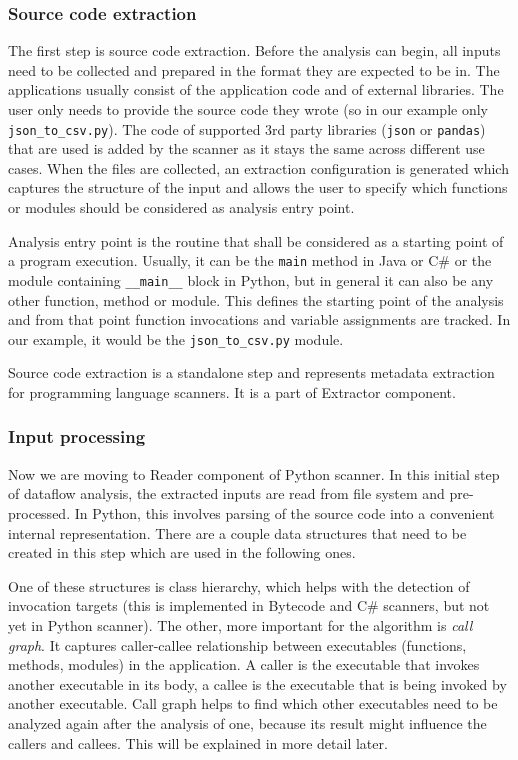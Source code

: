 \subsubsection{Source code extraction}

The first step is source code extraction. Before the analysis can begin, all inputs need to be collected and prepared in the format they are expected to be in. The applications usually consist of the application code and of external libraries. The user only needs to provide the source code they wrote (so in our example only \texttt{json\_to\_csv.py}). The code of supported 3rd party libraries (\texttt{json} or \texttt{pandas}) that are used is added by the scanner as it stays the same across different use cases. When the files are collected, an extraction configuration is generated which captures the structure of the input and allows the user to specify which functions or modules should be considered as analysis entry point.
\par
Analysis entry point is the routine that shall be considered as a starting point of a program execution. Usually, it can be the \texttt{main} method in Java or C\# or the module containing \texttt{\_\_main\_\_} block in Python, but in general it can also be any other function, method or module. This defines the starting point of the analysis and from that point function invocations and variable assignments are tracked. In our example, it would be the \texttt{json\_to\_csv.py} module.
\par
Source code extraction is a standalone step and represents metadata extraction for programming language scanners. It is a part of Extractor component.

\subsubsection{Input processing}

Now we are moving to Reader component of Python scanner. In this initial step of dataflow analysis, the extracted inputs are read from file system and pre-processed. In Python, this involves parsing of the source code into a convenient internal representation. There are a couple data structures that need to be created in this step which are used in the following ones.
\par
One of these structures is class hierarchy, which helps with the detection of invocation targets (this is implemented in Bytecode and C\# scanners, but not yet in Python scanner). The other, more important for the algorithm is \textit{call graph}. It captures caller-callee relationship between executables (functions, methods, modules) in the application. A caller is the executable that invokes another executable in its body, a callee is the executable that is being invoked by another executable. Call graph helps to find which other executables need to be analyzed again after the analysis of one, because its result might influence the callers and callees. This will be explained in more detail later.


